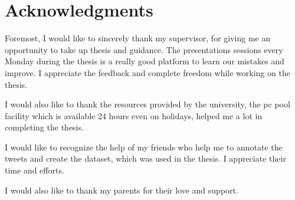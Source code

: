 \chapter*{Acknowledgments}

Foremost, I would like to sincerely thank my supervisor, for giving me an opportunity to take up thesis and guidance. The presentations sessions every Monday during the thesis is a really good platform to learn our mistakes and improve.  I appreciate the feedback and complete freedom while working on the thesis.

I would also like to thank the resources provided by the university, the pc pool facility which is available 24 hours even on holidays, helped me a lot in completing the thesis.

I would like to recognize the help of my friends who help me to annotate the tweets and create the dataset, which was used in the thesis. I appreciate their time and efforts.

I would also like to thank my parents for their love and support.